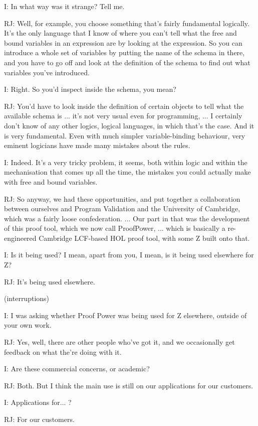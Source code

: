 \documentclass[10pt,titlepage]{book}
\begin{document}
I: In what way was it strange?
Tell me.

RJ: Well, for example, you choose something that's fairly fundamental logically.
It's the only language that I know of where you can't tell what the free and bound variables in an expression are by looking at the expression.
So you can introduce a whole set of variables by putting the name of the schema in there, and you have to go off and look at the definition of the schema to find out what variables you've introduced.

I: Right.
So you'd inspect inside the schema, you mean?

RJ: You'd have to look inside the definition of certain objects to tell what the available schema is ... it's not very usual even for programming, ... I certainly don't know of any other logics, logical languages, in which that's the case.
And it is very fundamental.
Even with much simpler variable-binding behaviour, very eminent logicians have made many mistakes about the rules.

I: Indeed.
It's a very tricky problem, it seems, both within logic and within the mechanisation that comes up all the time, the mistakes you could actually make with free and bound variables.

RJ: So anyway, we had these opportunities, and put together a collaboration between ourselves and Program Validation and the University of Cambridge, which was a fairly loose confederation.
...
Our part in that was the development of this proof tool, which we now call ProofPower, ... which is basically a re-engineered Cambridge LCF-based HOL proof tool, with some Z built onto that.

I: Is it being used?
I mean, apart from you, I mean, is it being used elsewhere for Z?

RJ: It's being used elsewhere.

(interruptions)

I: I was asking whether Proof Power was being used for Z elsewhere, outside of your own work.

RJ: Yes, well, there are other people who've got it, and we occasionally get feedback on what the're doing with it.

I: Are these commercial concerns, or academic?

RJ: Both.
But I think the main use is still on our applications for our customers.

I: Applications for... ?

RJ: For our customers.
\end{document}

